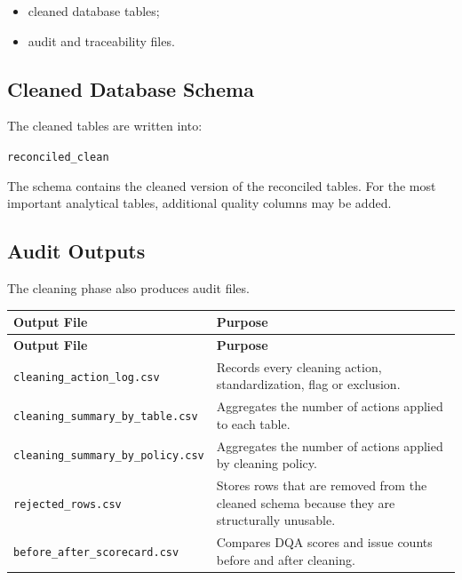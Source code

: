 \documentclass[a4paper,11pt]{article}
\begin{document}
	\begin{itemize}[leftmargin=1.2cm]
		\item cleaned database tables;
		\item audit and traceability files.
	\end{itemize}
	
	\subsection{Cleaned Database Schema}
	
	The cleaned tables are written into:
	
	\begin{center}
		\texttt{reconciled\_clean}
	\end{center}
	
	The schema contains the cleaned version of the reconciled tables.
	For the most important analytical tables, additional quality columns may be added.
	
	
	\subsection{Audit Outputs}
	
	The cleaning phase also produces audit files.
	
	\begin{longtable}{p{5.5cm}p{9cm}}
		\toprule
		\textbf{Output File} & \textbf{Purpose} \\
		\midrule
		\endfirsthead
		
		\toprule
		\textbf{Output File} & \textbf{Purpose} \\
		\midrule
		\endhead
		
		\texttt{cleaning\_action\_log.csv}
		& Records every cleaning action, standardization, flag or exclusion. \\
		\midrule
		
		\texttt{cleaning\_summary\_by\_table.csv}
		& Aggregates the number of actions applied to each table. \\
		\midrule
		
		\texttt{cleaning\_summary\_by\_policy.csv}
		& Aggregates the number of actions applied by cleaning policy. \\
		\midrule
		
		\texttt{rejected\_rows.csv}
		& Stores rows that are removed from the cleaned schema because they are structurally unusable. \\
		\midrule
		
		\texttt{before\_after\_scorecard.csv}
		& Compares DQA scores and issue counts before and after cleaning. \\
		\bottomrule
	\end{longtable}
	
\end{document}
